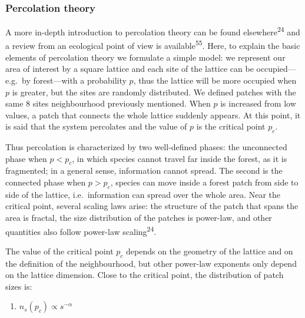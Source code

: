 \documentclass[]{article}
\providecommand{\tightlist}{%
  \setlength{\itemsep}{0pt}\setlength{\parskip}{0pt}}
\begin{document}
\subsubsection{Percolation theory}\label{percolation-theory}

A more in-depth introduction to percolation theory can be found
elsewhere\textsuperscript{24} and a review from an ecological point of
view is available\textsuperscript{55}. Here, to explain the basic
elements of percolation theory we formulate a simple model: we represent
our area of interest by a square lattice and each site of the lattice
can be occupied---e.g.~by forest---with a probability \(p\), thus the
lattice will be more occupied when \(p\) is greater, but the sites are
randomly distributed. We defined patches with the same 8 sites
neighbourhood previously mentioned. When \(p\) is increased from low
values, a patch that connects the whole lattice suddenly appears. At
this point, it is said that the system percolates and the value of \(p\)
is the critical point \(p_c\).

Thus percolation is characterized by two well-defined phases: the
unconnected phase when \(p<p_c\), in which species cannot travel far
inside the forest, as it is fragmented; in a general sense, information
cannot spread. The second is the connected phase when \(p>p_c\), species
can move inside a forest patch from side to side of the lattice,
i.e.~information can spread over the whole area. Near the critical
point, several scaling laws arise: the structure of the patch that spans
the area is fractal, the size distribution of the patches is power-law,
and other quantities also follow power-law scaling\textsuperscript{24}.

The value of the critical point \(p_c\) depends on the geometry of the
lattice and on the definition of the neighbourhood, but other power-law
exponents only depend on the lattice dimension. Close to the critical
point, the distribution of patch sizes is:

\begin{enumerate}
\def\labelenumi{(\arabic{enumi})}
\tightlist
\item
  \(n_s(p_c) \propto s^{-\alpha}\)
\end{enumerate}
\end{document}
